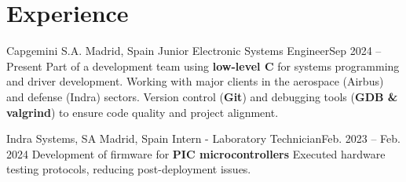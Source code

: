 \section{Experience}
    \resumeHeaderItemListStart

        \resumeExpItem
            { Capgemini S.A. }{ Madrid, Spain }
            {Junior Electronic Systems Engineer}{Sep 2024 -- Present}
        \resumeSubItemListStart
            \resumeSubItem
            {
                Part of a development team using \textbf{low-level C} for systems programming and driver development.
            }
            \resumeSubItem
            {
                Working with major clients in the aerospace (Airbus) and defense (Indra) sectors.
            }
            \resumeSubItem
            {
                Version control (\textbf{Git}) and debugging tools (\textbf{GDB \& valgrind}) to ensure code quality and project alignment.
            }
        \resumeSubItemListEnd

        \resumeExpItem
            { Indra Systems, SA }{Madrid, Spain}
            {Intern - Laboratory Technician}{Feb. 2023 -- Feb. 2024}
        \resumeSubItemListStart
            \resumeSubItem
            {
                Development of firmware for \textbf{PIC microcontrollers}
            }
            \resumeSubItem
            {
                Executed hardware testing protocols, reducing post-deployment issues.
            }
        \resumeSubItemListEnd

    \resumeHeaderItemListEnd
